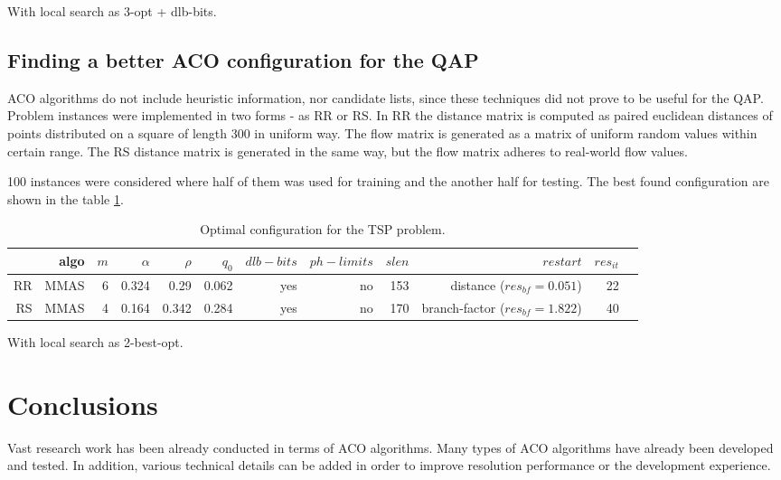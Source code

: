 \documentclass[12pt]{article}
\begin{document}
With local search as 3-opt + dlb-bits.

\subsection{Finding a better ACO configuration for the QAP}

ACO algorithms do not include heuristic information, nor candidate lists, since these techniques did not prove to be useful for the QAP. Problem instances were implemented in two forms - as RR or RS. In RR the distance matrix is computed as paired euclidean distances of points distributed on a square of length 300 in uniform way. The flow matrix is generated as a matrix of uniform random values within certain range. The RS distance matrix is generated in the same way, but the flow matrix adheres to real-world flow values.

100 instances were considered where half of them was used for training and the another half for testing. The best found configuration are shown in the table \ref{table:table-qap}.

\begin{table}[ht]
\centering
\resizebox{\textwidth}{!}
{
\begin{tabular}{|r|r|r|r|r|r|r|r|r|r|r|r|}
  \hline 
    & algo & $m$ & $\alpha$ & $\rho$ & $q_0$ & $dlb-bits$ & $ph-limits$ & $slen$ & $restart$ & $res_{it}$\\ \hline
    RR & MMAS & 6 & 0.324 & 0.29 & 0.062 & yes & no & 153 & distance ($res_{bf} = 0.051$) & 22\\ \hline
	RS & MMAS & 4 & 0.164 & 0.342 & 0.284 & yes & no & 170 & branch-factor ($res_{bf} = 1.822$) & 40\\ \hline
\end{tabular}
}
\caption{Optimal configuration for the TSP problem.}
\label{table:table-qap} 
\end{table} 

With local search as 2-best-opt.

\section{Conclusions}

Vast research work has been already conducted in terms of ACO algorithms. Many types of ACO algorithms have already been developed and tested. In addition, various technical details can be added in order to improve resolution performance or the development experience. 
\end{document}
